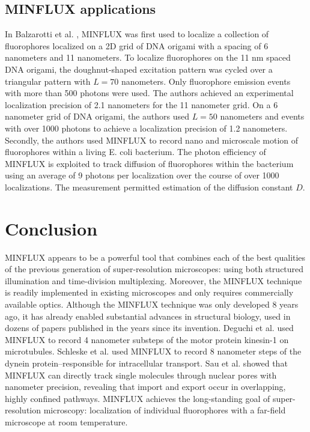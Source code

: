 \documentclass[12pt]{article}
\begin{document}
\subsection{MINFLUX applications}

In Balzarotti et al. \cite{balzarottiNanometerResolutionImaging2017}, MINFLUX was first used to localize a collection of fluorophores localized on a 2D grid of DNA origami with a spacing of 6 nanometers and 11 nanometers. To localize fluorophores on the 11 nm spaced DNA origami, the doughnut-shaped excitation pattern was cycled over a triangular pattern with $L=70$ nanometers. Only fluorophore emission events with more than 500 photons were used. The authors achieved an experimental localization precision of 2.1 nanometers for the 11 nanometer grid. On a 6 nanometer grid of DNA origami, the authors used $L=50$ nanometers and events with over 1000 photons to achieve a localization precision of 1.2 nanometers. Secondly, the authors used MINFLUX to record nano and microscale motion of fluorophores within a living E. coli bacterium. The photon efficiency of MINFLUX is exploited to track diffusion of fluorophores within the bacterium using an average of 9 photons per localization over the course of over 1000 localizations. The measurement permitted estimation of the diffusion constant $D$. 

\section{Conclusion}

MINFLUX appears to be a powerful tool that combines each of the best qualities of the previous generation of super-resolution microscopes: using both structured illumination and time-division multiplexing.  Moreover, the MINFLUX technique is readily implemented in existing microscopes and only requires commercially available optics. Although the MINFLUX technique was only developed 8 years ago, it has already enabled substantial advances in structural biology, used in dozens of papers published in the years since its invention. Deguchi et al. \cite{deguchiDirectObservationMotor} used MINFLUX to record 4 nanometer substeps of the motor protein kinesin-1 on microtubules. Schleske et al. \cite{schleskeMINFLUXRevealsDynein2024} used MINFLUX to record 8 nanometer steps of the dynein protein--responsible for intracellular transport. Sau et al. \cite{sauOverlappingNuclearImport2025} showed that MINFLUX can directly track single molecules through nuclear pores with nanometer precision, revealing that import and export occur in overlapping, highly confined pathways. MINFLUX achieves the long-standing goal of super-resolution microscopy: localization of individual fluorophores with a far-field microscope at room temperature.

\printbibliography
\end{document}
